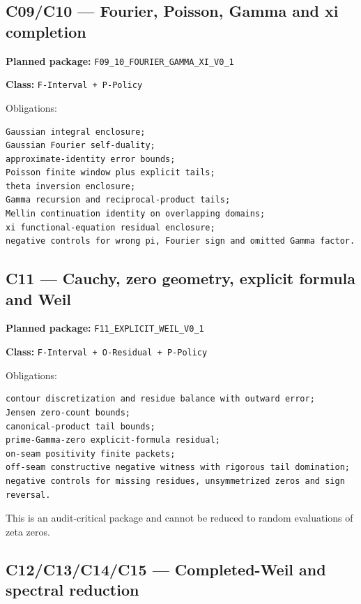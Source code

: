 \hypertarget{c09c10-fourier-poisson-gamma-and-xi-completion}{%
\subsection{C09/C10 --- Fourier, Poisson, Gamma and xi completion}\label{c09c10-fourier-poisson-gamma-and-xi-completion}}

\textbf{Planned package:} \texttt{F09\_10\_FOURIER\_GAMMA\_XI\_V0\_1}

\textbf{Class:} \texttt{F-Interval\ +\ P-Policy}

Obligations:

\begin{verbatim}
Gaussian integral enclosure;
Gaussian Fourier self-duality;
approximate-identity error bounds;
Poisson finite window plus explicit tails;
theta inversion enclosure;
Gamma recursion and reciprocal-product tails;
Mellin continuation identity on overlapping domains;
xi functional-equation residual enclosure;
negative controls for wrong pi, Fourier sign and omitted Gamma factor.
\end{verbatim}

\hypertarget{c11-cauchy-zero-geometry-explicit-formula-and-weil}{%
\subsection{C11 --- Cauchy, zero geometry, explicit formula and Weil}\label{c11-cauchy-zero-geometry-explicit-formula-and-weil}}

\textbf{Planned package:} \texttt{F11\_EXPLICIT\_WEIL\_V0\_1}

\textbf{Class:} \texttt{F-Interval\ +\ O-Residual\ +\ P-Policy}

Obligations:

\begin{verbatim}
contour discretization and residue balance with outward error;
Jensen zero-count bounds;
canonical-product tail bounds;
prime-Gamma-zero explicit-formula residual;
on-seam positivity finite packets;
off-seam constructive negative witness with rigorous tail domination;
negative controls for missing residues, unsymmetrized zeros and sign reversal.
\end{verbatim}

This is an audit-critical package and cannot be reduced to random evaluations of zeta zeros.

\hypertarget{c12c13c14c15-completed-weil-and-spectral-reduction}{%
\subsection{C12/C13/C14/C15 --- Completed-Weil and spectral reduction}\label{c12c13c14c15-completed-weil-and-spectral-reduction}}


